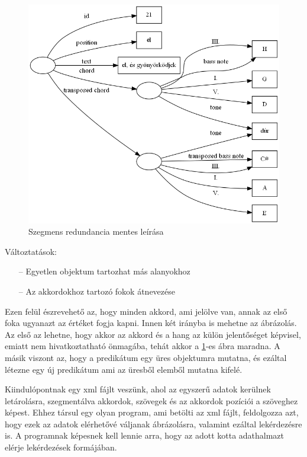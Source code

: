 \begin{figure}[h]
	\includegraphics[scale=0.5]{images/img_src/rdf_graph_7.png}
	\caption{Szegmens redundancia mentes leírása}
	\label{fig:graph7}
\end{figure}
\newpage
Változtatások:
\begin{itemize}
	\item[--] Egyetlen objektum tartozhat más alanyokhoz
	\item[--] Az akkordokhoz tartozó fokok átnevezése
\end{itemize}

Ezen felül észrevehető az, hogy minden akkord, ami jelölve van, annak az első foka ugyanazt az értéket fogja kapni. Innen két irányba is mehetne az ábrázolás. Az első az lehetne, hogy akkor az akkord és a hang az külön jelentőséget képvisel, emiatt nem hivatkoztatható önmagába, tehát akkor a \ref{fig:graph7}-es ábra maradna. A másik viszont az, hogy a predikátum egy üres objektumra mutatna, és ezáltal létezne egy új predikátum ami az üresből elemből mutatna kifelé.


Kiindulópontnak egy xml fájlt veszünk, ahol az egyszerű adatok kerülnek letárolásra, szegmentálva akkordok, szövegek és az akkordok pozíciói a szöveghez képest. Ehhez társul egy olyan program, ami betölti az xml fájlt, feldolgozza azt, hogy ezek az adatok elérhetővé váljanak ábrázolásra, valamint ezáltal lekérdezésre is. A programnak képesnek kell lennie arra, hogy az adott kotta adathalmazt elérje lekérdezések formájában.

